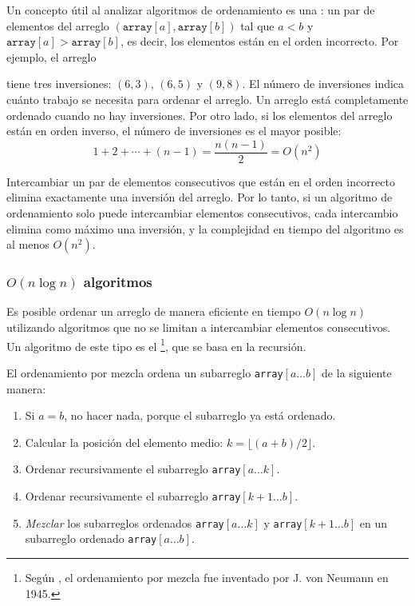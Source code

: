 Un concepto útil al analizar algoritmos de ordenamiento
es una :
un par de elementos del arreglo
$(\texttt{array}[a],\texttt{array}[b])$ tal que
$a<b$ y $\texttt{array}[a]>\texttt{array}[b]$,
es decir, los elementos están en el orden incorrecto.
Por ejemplo, el arreglo
\begin{center}
\end{center}
tiene tres inversiones: $(6,3)$, $(6,5)$ y $(9,8)$.
El número de inversiones indica
cuánto trabajo se necesita para ordenar el arreglo.
Un arreglo está completamente ordenado cuando
no hay inversiones.
Por otro lado, si los elementos del arreglo
están en orden inverso,
el número de inversiones es el mayor posible:
\[1+2+\cdots+(n-1)=\frac{n(n-1)}{2} = O(n^2)\]

Intercambiar un par de elementos consecutivos que están
en el orden incorrecto elimina exactamente una inversión
del arreglo.
Por lo tanto, si un algoritmo de ordenamiento solo puede
intercambiar elementos consecutivos, cada intercambio elimina
como máximo una inversión, y la complejidad en tiempo
del algoritmo es al menos $O(n^2)$.

\subsubsection{$O(n \log n)$ algoritmos}


Es posible ordenar un arreglo de manera eficiente
en tiempo $O(n \log n)$ utilizando algoritmos
que no se limitan a intercambiar elementos consecutivos.
Un algoritmo de este tipo es el \footnote{Según \cite{knu983},
el ordenamiento por mezcla fue inventado por J. von Neumann en 1945.},
que se basa en la recursión.

El ordenamiento por mezcla ordena un subarreglo \texttt{array}$[a \ldots b]$ de la siguiente manera:

\begin{enumerate}
\item Si $a=b$, no hacer nada, porque el subarreglo ya está ordenado.
\item Calcular la posición del elemento medio: $k=\lfloor (a+b)/2 \rfloor$.
\item Ordenar recursivamente el subarreglo \texttt{array}$[a \ldots k]$.
\item Ordenar recursivamente el subarreglo \texttt{array}$[k+1 \ldots b]$.
\item \emph{Mezclar} los subarreglos ordenados \texttt{array}$[a \ldots k]$ y
\texttt{array}$[k+1 \ldots b]$
en un subarreglo ordenado \texttt{array}$[a \ldots b]$.
\end{enumerate}

